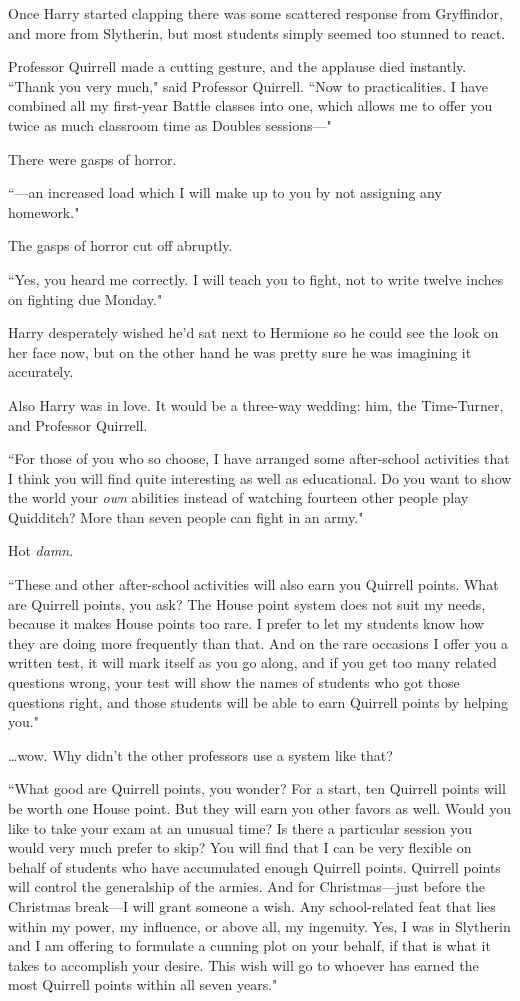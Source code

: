 Once Harry started clapping there was some scattered response from Gryffindor, and more from Slytherin, but most students simply seemed too stunned to react.

Professor Quirrell made a cutting gesture, and the applause died instantly. ``Thank you very much," said Professor Quirrell. ``Now to practicalities. I have combined all my first-year Battle classes into one, which allows me to offer you twice as much classroom time as Doubles sessions—"

There were gasps of horror.

``—an increased load which I will make up to you by not assigning any homework."

The gasps of horror cut off abruptly.

``Yes, you heard me correctly. I will teach you to fight, not to write twelve inches on fighting due Monday."

Harry desperately wished he'd sat next to Hermione so he could see the look on her face now, but on the other hand he was pretty sure he was imagining it accurately.

Also Harry was in love. It would be a three-way wedding: him, the Time-Turner, and Professor Quirrell.

``For those of you who so choose, I have arranged some after-school activities that I think you will find quite interesting as well as educational. Do you want to show the world your \emph{own} abilities instead of watching fourteen other people play Quidditch? More than seven people can fight in an army."

Hot \emph{damn}.

``These and other after-school activities will also earn you Quirrell points. What are Quirrell points, you ask? The House point system does not suit my needs, because it makes House points too rare. I prefer to let my students know how they are doing more frequently than that. And on the rare occasions I offer you a written test, it will mark itself as you go along, and if you get too many related questions wrong, your test will show the names of students who got those questions right, and those students will be able to earn Quirrell points by helping you."

{\ldots}wow. Why didn't the other professors use a system like that?

``What good are Quirrell points, you wonder? For a start, ten Quirrell points will be worth one House point. But they will earn you other favors as well. Would you like to take your exam at an unusual time? Is there a particular session you would very much prefer to skip? You will find that I can be very flexible on behalf of students who have accumulated enough Quirrell points. Quirrell points will control the generalship of the armies. And for Christmas—just before the Christmas break—I will grant someone a wish. Any school-related feat that lies within my power, my influence, or above all, my ingenuity. Yes, I was in Slytherin and I am offering to formulate a cunning plot on your behalf, if that is what it takes to accomplish your desire. This wish will go to whoever has earned the most Quirrell points within all seven years."


